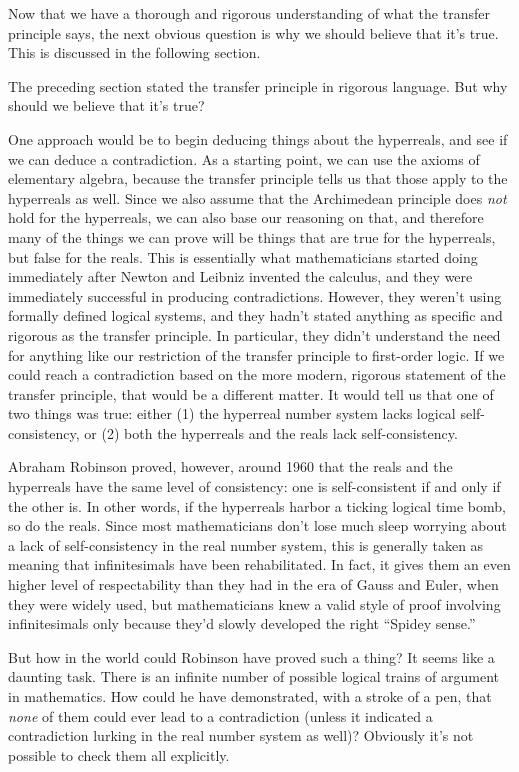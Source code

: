 Now that we have a thorough and rigorous understanding of what the transfer principle says, the next obvious
question is why we should believe that it's true. This is discussed in the following section.


The preceding section stated the transfer principle in rigorous language. But why should we believe that it's
true?

One approach would be to begin deducing things about the hyperreals, and see if we can deduce a contradiction.
As a starting point, we can use the axioms of elementary algebra, because the transfer principle tells us that
those apply to the hyperreals as well. Since we also assume that the Archimedean principle does \emph{not} hold
for the hyperreals, we can also base our reasoning on that, and therefore many of the things we can prove
will be things that are true for the hyperreals, but false for the reals. This is essentially what mathematicians
started doing immediately after Newton and Leibniz invented the calculus, and they were immediately successful
in producing contradictions. However, they weren't using formally defined logical systems, and they hadn't
stated anything as specific and rigorous as the transfer principle. In particular, they didn't understand
the need for anything like our restriction of the transfer principle to first-order logic. If we could
reach a contradiction based on the more modern, rigorous statement of the transfer principle, that would
be a different matter. It would tell us that one of two things was true: either (1) the hyperreal number system lacks logical self-consistency,
or (2) both the hyperreals and the reals lack self-consistency.

Abraham Robinson proved, however, around 1960 that the reals and the hyperreals have the same level of
consistency: one is self-consistent if and only if the other is. In other words, if the hyperreals harbor
a ticking logical time bomb, so do the reals. Since most mathematicians don't lose much sleep worrying
about a lack of self-consistency in the real number system, this is generally taken as meaning that
infinitesimals have been rehabilitated. In fact, it gives them an even higher level of respectability than
they had in the era of Gauss and Euler, when they were widely used, but mathematicians knew a valid
style of proof involving infinitesimals only because they'd slowly developed the right ``Spidey sense.''

But how in the world could Robinson have proved such a thing? It seems like a daunting task. There is
an infinite number of possible logical trains of argument in mathematics. How could he have demonstrated, with
a stroke of a pen, that \emph{none} of them could ever lead to a contradiction (unless it indicated
a contradiction lurking in the real number system as well)? Obviously it's not possible to check
them all explicitly.

